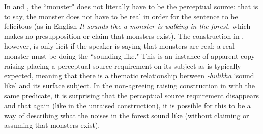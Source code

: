 \documentclass[output=paper,colorlinks,citecolor=brown
]{langscibook}
\begin{document}
In  and , the ``monster" does not literally have to be the perceptual source: that is to say, the monster does not have to be real in order for the sentence to be felicitous (as in English \textit{It sounds like a monster is walking in the forest}, which makes no presupposition or claim that monsters exist). The construction in , however, is only licit if the speaker is saying that monsters are real: a real monster must be doing the ``sounding like." This is an instance of apparent copy-raising placing a perceptual-source requirement on its subject as is typically expected, meaning that there is a thematic relationship between \textit{-hulikha} `sound like' and its surface subject. In the non-agreeing raising construction in  with the same predicate, it is surprising that the perceptual source requirement disappears and that again (like in the unraised construction), it is possible for this to be a way of describing what the noises in the forest sound like (without claiming or assuming that monsters exist). 






\end{document}

